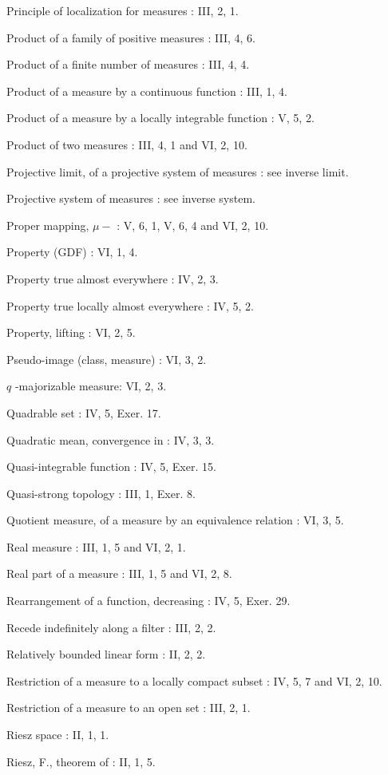 Principle of localization for measures : III, 2, 1.

Product of a family of positive measures : III, 4, 6.

Product of a finite number of measures : III, 4, 4.

Product of a measure by a continuous function : III, 1, 4.

Product of a measure by a locally integrable function : V, 5, 2.

Product of two measures : III, 4, 1 and VI, 2, 10.

Projective limit, of a projective system of measures : see inverse limit.

Projective system of measures : see inverse system.

Proper mapping, \(\mu-\) : V, 6, 1, V, 6, 4 and VI, 2, 10.

Property (GDF) : VI, 1, 4.

Property true almost everywhere : IV, 2, 3.

Property true locally almost everywhere : IV, 5, 2.

Property, lifting : VI, 2, 5.

Pseudo-image (class, measure) : VI, 3, 2.

\(q\) -majorizable measure: VI, 2, 3.

Quadrable set : IV, 5, Exer. 17.

Quadratic mean, convergence in : IV, 3, 3.

Quasi-integrable function : IV, 5, Exer. 15.

Quasi-strong topology : III, 1, Exer. 8.

Quotient measure, of a measure by an equivalence relation : VI, 3, 5.

Real measure : III, 1, 5 and VI, 2, 1.

Real part of a measure : III, 1, 5 and VI, 2, 8.

Rearrangement of a function, decreasing : IV, 5, Exer. 29.

Recede indefinitely along a filter : III, 2, 2.

Relatively bounded linear form : II, 2, 2.

Restriction of a measure to a locally compact subset : IV, 5, 7 and VI, 2, 10.

Restriction of a measure to an open set : III, 2, 1.

Riesz space : II, 1, 1.

Riesz, F., theorem of : II, 1, 5.

